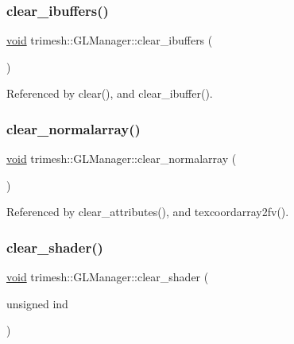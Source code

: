 \subsubsection{\texorpdfstring{clear\+\_\+ibuffers()}{clear\_ibuffers()}}
{\footnotesize\ttfamily \hyperlink{namespacetrimesh_a784ddfd979e1c579bda795a8edfc3f43}{void} trimesh\+::\+G\+L\+Manager\+::clear\+\_\+ibuffers (\begin{DoxyParamCaption}{ }\end{DoxyParamCaption})}



Referenced by clear(), and clear\+\_\+ibuffer().

\mbox{\label{classtrimesh_1_1GLManager_ab11e9865b68f1481a55429491471eaa9}} 
\subsubsection{\texorpdfstring{clear\+\_\+normalarray()}{clear\_normalarray()}}
{\footnotesize\ttfamily \hyperlink{namespacetrimesh_a784ddfd979e1c579bda795a8edfc3f43}{void} trimesh\+::\+G\+L\+Manager\+::clear\+\_\+normalarray (\begin{DoxyParamCaption}{ }\end{DoxyParamCaption})}



Referenced by clear\+\_\+attributes(), and texcoordarray2fv().

\mbox{\label{classtrimesh_1_1GLManager_a399b260a08d77d96efef3ae3ada38bcb}} 
\subsubsection{\texorpdfstring{clear\+\_\+shader()}{clear\_shader()}\hspace{0.1cm}{\footnotesize\ttfamily [1/2]}}
{\footnotesize\ttfamily \hyperlink{namespacetrimesh_a784ddfd979e1c579bda795a8edfc3f43}{void} trimesh\+::\+G\+L\+Manager\+::clear\+\_\+shader (\begin{DoxyParamCaption}\item[{unsigned}]{ind }\end{DoxyParamCaption})}



